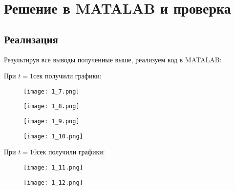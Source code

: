 \documentclass[a4paper]{article}
\begin{document}
\newpage
\section{Решение в MATALAB и проверка}

\subsection{Реализация}

Результируя все выводы полученные выше, реализуем код в MATALAB:



При $ t = 1 сек $ получили графики:

\begin{figure}[H]
\begin{center}
\begin{minipage}[h]{0.4\linewidth}
\texttt{[image: 1\_7.png]}
\caption{} %
\label{ris:experimoriginal}
\end{minipage}
\hfill
\begin{minipage}[h]{0.4\linewidth}
\texttt{[image: 1\_8.png]}
\caption{}
\label{ris:experimcoded}
\end{minipage}
\end{center}
\end{figure}

\begin{figure}[H]
\begin{center}
\begin{minipage}[h]{0.4\linewidth}
\texttt{[image: 1\_9.png]}
\caption{} %
\label{ris:experimoriginal}
\end{minipage}
\hfill
\begin{minipage}[h]{0.4\linewidth}
\texttt{[image: 1\_10.png]}
\caption{}
\label{ris:experimcoded}
\end{minipage}
\end{center}
\end{figure}

При $t=10 сек$ получили графики:

\begin{figure}[H]
\begin{center}
\begin{minipage}[h]{0.4\linewidth}
\texttt{[image: 1\_11.png]}
\caption{} %
\label{ris:experimoriginal}
\end{minipage}
\hfill
\begin{minipage}[h]{0.4\linewidth}
\texttt{[image: 1\_12.png]}
\caption{}
\label{ris:experimcoded}
\end{minipage}
\end{center}
\end{figure}
\end{document}

